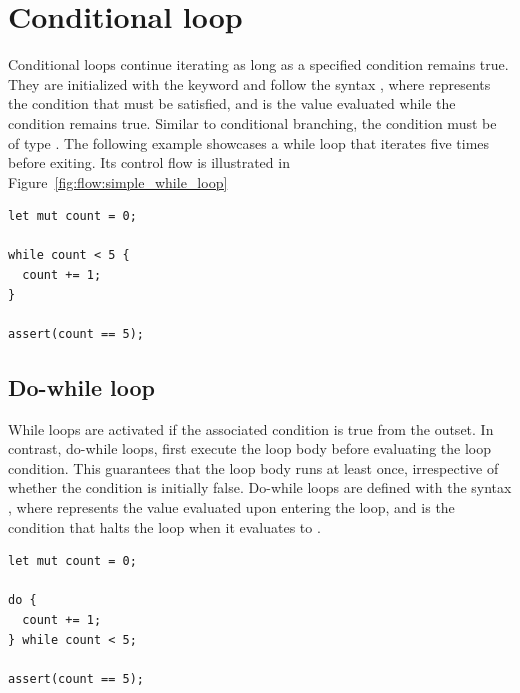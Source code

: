 \section{Conditional loop}%
\label{sec:flow:while_loop}

Conditional loops continue iterating as long as a specified condition remains
true. They are initialized with the keyword  and follow the syntax
, where  represents the condition that must be
satisfied, and  is the value evaluated while the condition remains
true. Similar to conditional branching, the condition  must be of type
. The following example showcases a while loop that iterates five
times before exiting. Its control flow is illustrated in
Figure~\ref{fig:flow:simple_while_loop}

\begin{lstlisting}[style=coloredverbatim, caption=Simple while loop, label=lst:flow:simple_while_loop]
let mut count = 0;

while count < 5 {
  count += 1;
}

assert(count == 5);
\end{lstlisting}



\subsection{Do-while loop}
\label{sec:flow:do_while_loop}

While loops are activated if the associated condition is true from the outset.
In contrast, do-while loops, first execute the loop body before evaluating the
loop condition. This guarantees that the loop body runs at least once,
irrespective of whether the condition is initially false. Do-while loops are
defined with the syntax , where  represents the
value evaluated upon entering the loop, and  is the condition that
halts the loop when it evaluates to .

\begin{lstlisting}[style=coloredverbatim, caption=Simple do while loop, label=lst:flow:simple_do_while_loop]
let mut count = 0;

do {
  count += 1;
} while count < 5;

assert(count == 5);
\end{lstlisting}



